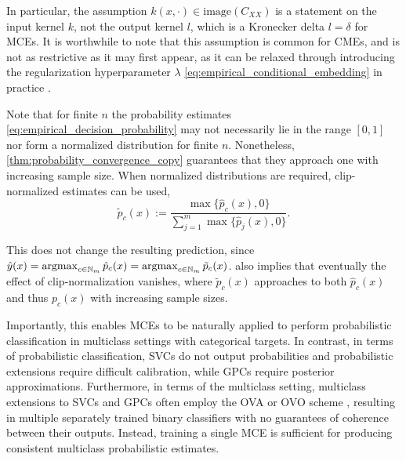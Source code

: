 \documentclass[runningheads, envcountsame, a4paper]{llncs}
\newcommand{\argmax}{\operatornamewithlimits{argmax}}
\begin{document}
		In particular, the assumption $k(x, \cdot) \in \mathrm{image}(C_{XX})$ is a statement on the input kernel $k$, not the output kernel $l$, which is a Kronecker delta $l = \delta$ for \glspl{MCE}. It is worthwhile to note that this assumption is common for \glspl{CME}, and is not as restrictive as it may first appear, as it can be relaxed through introducing the regularization hyperparameter $\lambda$ \eqref{eq:empirical_conditional_embedding} in practice \citep[p.74-75, Sec. 3 and 3.1 \textit{resp.}]{song2009hilbert, song2013kernel, muandet2016kernel}.
		
		Note that for finite $n$ the probability estimates \eqref{eq:empirical_decision_probability} may not necessarily lie in the range $[0,1]$ nor form a normalized distribution for finite $n$. Nonetheless, \cref{thm:probability_convergence_copy} guarantees that they approach one with increasing sample size. When normalized distributions are required, clip-normalized estimates can be used,
		\begin{equation}
			\tilde{p}_{c}(x) := \frac{\max\{\hat{p}_{c}(x), 0\}}{\sum_{j = 1}^{m} \max\{\hat{p}_{j}(x), 0\}}.
		\label{eq:empirical_decision_probability_clip_normalized}
		\end{equation}
		
		This does not change the resulting prediction, since $\hat{y}(x) = \argmax_{c \in \mathbb{N}_{m}} \hat{p}_{c}(x) = \argmax_{c \in \mathbb{N}_{m}} \tilde{p}_{c}(x)$.  also implies that eventually the effect of clip-normalization vanishes, where $\tilde{p}_{c}(x)$ approaches to both $\hat{p}_{c}(x)$ and thus $p_{c}(x)$ with increasing sample sizes.
		
		Importantly, this enables \glspl{MCE} to be naturally applied to perform probabilistic classification in multiclass settings with categorical targets. In contrast, in terms of probabilistic classification, \glspl{SVC} do not output probabilities and probabilistic extensions require difficult calibration, while \glspl{GPC} require posterior approximations. Furthermore, in terms of the multiclass setting, multiclass extensions to \glspl{SVC} and \glspl{GPC} often employ the \gls{OVA} or \gls{OVO} scheme \citep{aly2005survey}, resulting in multiple separately trained binary classifiers with no guarantees of coherence between their outputs. Instead, training a single \gls{MCE} is sufficient for producing consistent multiclass probabilistic estimates.
		
\end{document}
